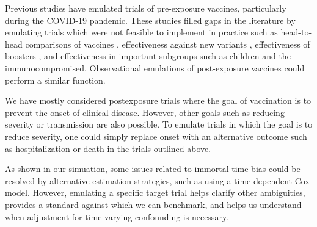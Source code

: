 \documentclass[11pt]{article}
\begin{document}
Previous studies have emulated trials of pre-exposure vaccines, particularly during the COVID-19 pandemic. These studies filled gaps in the literature by emulating trials which were not feasible to implement in practice such as head-to-head comparisons of vaccines \cite{dickerman_comparative_2022}, effectiveness against new variants \cite{cohen-stavi_bnt162b2_2022}, effectiveness of boosters \cite{barda_effectiveness_2021,magen_fourth_2022}, and effectiveness in important subgroups such as children \cite{cohen-stavi_bnt162b2_2022} and the immunocompromised. Observational emulations of post-exposure vaccines could perform a similar function.

We have mostly considered postexposure trials where the goal of vaccination is to prevent the onset of clinical disease. However, other goals such as reducing severity or transmission are also possible. To emulate trials in which the goal is to reduce severity, one could simply replace onset with an alternative outcome such as hospitalization or death in the trials outlined above. 

As shown in our simuation, some issues related to immortal time bias could be resolved by alternative estimation strategies, such as using a time-dependent Cox model. However, emulating a specific target trial helps clarify other ambiguities, provides a standard against which we can benchmark, and helps us understand when adjustment for time-varying confounding is necessary.


    
\end{document}
